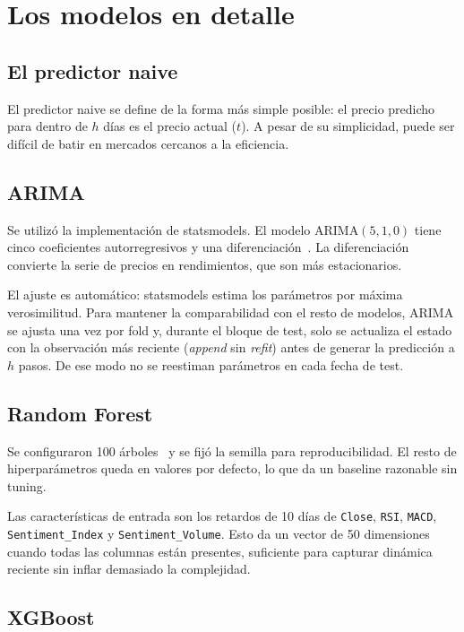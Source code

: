 \section{Los modelos en detalle}

\subsection{El predictor naive}

El predictor naive se define de la forma más simple posible: el precio predicho para dentro de $h$ días es el precio actual ($t$). A pesar de su simplicidad, puede ser difícil de batir en mercados cercanos a la eficiencia.

\subsection{ARIMA}

Se utilizó la implementación de statsmodels. El modelo ARIMA$(5,1,0)$ tiene cinco coeficientes autorregresivos y una diferenciación~\cite{box2015time}. La diferenciación convierte la serie de precios en rendimientos, que son más estacionarios.

El ajuste es automático: statsmodels estima los parámetros por máxima verosimilitud. Para mantener la comparabilidad con el resto de modelos, ARIMA se ajusta una vez por fold y, durante el bloque de test, solo se actualiza el estado con la observación más reciente (\textit{append} sin \textit{refit}) antes de generar la predicción a $h$ pasos. De ese modo no se reestiman parámetros en cada fecha de test.

\subsection{Random Forest}

Se configuraron 100 árboles~\cite{breiman2001random} y se fijó la semilla para reproducibilidad. El resto de hiperparámetros queda en valores por defecto, lo que da un baseline razonable sin tuning.

Las características de entrada son los retardos de 10 días de \texttt{Close}, \texttt{RSI}, \texttt{MACD}, \texttt{Sentiment\_Index} y \texttt{Sentiment\_Volume}. Esto da un vector de 50 dimensiones cuando todas las columnas están presentes, suficiente para capturar dinámica reciente sin inflar demasiado la complejidad.

\subsection{XGBoost}

